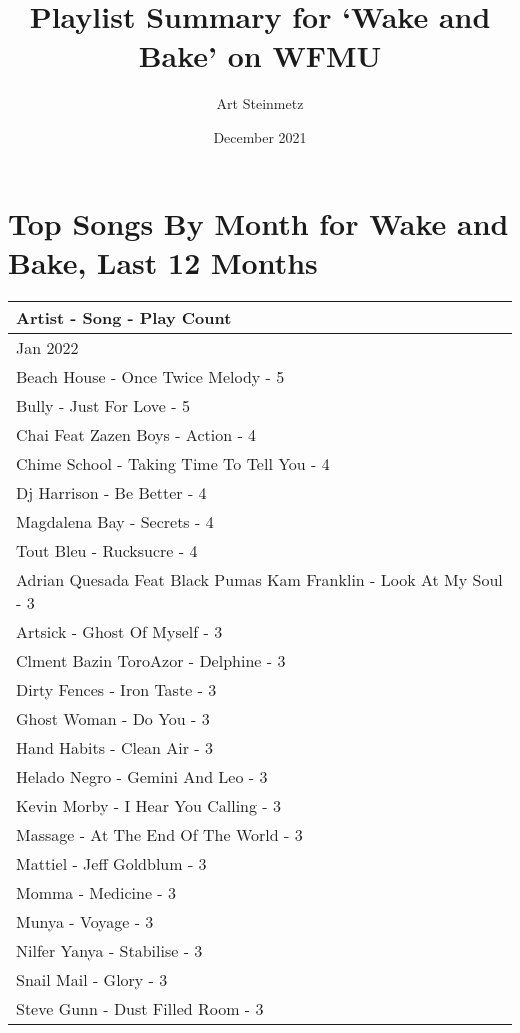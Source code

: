 \documentclass[
]{article}
\title{Playlist Summary for `Wake and Bake' on WFMU}
\author{Art Steinmetz}
\date{December 2021}
\begin{document}
\maketitle

{
\setcounter{tocdepth}{2}
\tableofcontents
}
\hypertarget{top-songs-by-month-for-wake-and-bake-last-12-months}{%
\section{Top Songs By Month for Wake and Bake, Last 12
Months}\label{top-songs-by-month-for-wake-and-bake-last-12-months}}

\captionsetup[table]{labelformat=empty,skip=1pt}
\begin{longtable}{l}
\toprule
\textbf{Artist - Song - Play Count} \\ 
\midrule
\multicolumn{1}{l}{Jan 2022} \\ 
\midrule
Beach House - Once Twice Melody - 5 \\ 
Bully - Just For Love - 5 \\ 
Chai Feat Zazen Boys - Action - 4 \\ 
Chime School - Taking Time To Tell You - 4 \\ 
Dj Harrison - Be Better - 4 \\ 
Magdalena Bay - Secrets - 4 \\ 
Tout Bleu - Rucksucre - 4 \\ 
Adrian Quesada Feat Black Pumas Kam Franklin - Look At My Soul - 3 \\ 
Artsick - Ghost Of Myself - 3 \\ 
Clment Bazin ToroAzor - Delphine - 3 \\ 
Dirty Fences - Iron Taste - 3 \\ 
Ghost Woman - Do You - 3 \\ 
Hand Habits - Clean Air - 3 \\ 
Helado Negro - Gemini And Leo - 3 \\ 
Kevin Morby - I Hear You Calling - 3 \\ 
Massage - At The End Of The World - 3 \\ 
Mattiel - Jeff Goldblum - 3 \\ 
Momma - Medicine - 3 \\ 
Munya - Voyage - 3 \\ 
Nilfer Yanya - Stabilise - 3 \\ 
Snail Mail - Glory - 3 \\ 
Steve Gunn - Dust Filled Room - 3 \\ 

\end{longtable}
\end{document}
